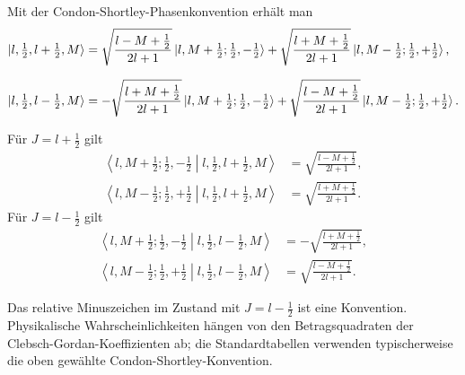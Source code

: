 \documentclass[11pt,a4paper]{scrartcl}
\begin{document}
\begin{calculationbox}
        \begin{calculationbox}[title=Normierte Eigenzustände]
            Mit der Condon-Shortley-Phasenkonvention erhält man
            \begin{align*}
                \ket{l,\tfrac12,l+\tfrac12,M}
                &=
                \sqrt{\frac{l-M+\frac12}{2l+1}}
                \ket{l,M+\tfrac12;\tfrac12,-\tfrac12}
                +
                \sqrt{\frac{l+M+\frac12}{2l+1}}
                \ket{l,M-\tfrac12;\tfrac12,+\tfrac12},\\[0.7em]
                \ket{l,\tfrac12,l-\tfrac12,M}
                &=
                -\sqrt{\frac{l+M+\frac12}{2l+1}}
                \ket{l,M+\tfrac12;\tfrac12,-\tfrac12}
                +
                \sqrt{\frac{l-M+\frac12}{2l+1}}
                \ket{l,M-\tfrac12;\tfrac12,+\tfrac12}.
            \end{align*}
        \end{calculationbox}

        \begin{solutionbox}[title=Clebsch-Gordan-Koeffizienten]
            Für $J=l+\frac12$ gilt
            \begin{align*}
                \left\langle l,M+\frac12;\frac12,-\frac12\middle|l,\frac12,l+\frac12,M\right\rangle
                &=
                \sqrt{\frac{l-M+\frac12}{2l+1}},\\
                \left\langle l,M-\frac12;\frac12,+\frac12\middle|l,\frac12,l+\frac12,M\right\rangle
                &=
                \sqrt{\frac{l+M+\frac12}{2l+1}}.
            \end{align*}
            Für $J=l-\frac12$ gilt
            \begin{align*}
                \left\langle l,M+\frac12;\frac12,-\frac12\middle|l,\frac12,l-\frac12,M\right\rangle
                &=
                -\sqrt{\frac{l+M+\frac12}{2l+1}},\\
                \left\langle l,M-\frac12;\frac12,+\frac12\middle|l,\frac12,l-\frac12,M\right\rangle
                &=
                \sqrt{\frac{l-M+\frac12}{2l+1}}.
            \end{align*}
        \end{solutionbox}

        \begin{notebox}[title=Hinweis zur Phase]
            Das relative Minuszeichen im Zustand mit $J=l-\frac12$ ist eine Konvention. Physikalische Wahrscheinlichkeiten hängen von den Betragsquadraten der Clebsch-Gordan-Koeffizienten ab; die Standardtabellen verwenden typischerweise die oben gewählte Condon-Shortley-Konvention.
        \end{notebox}
    \end{calculationbox}
\end{document}
